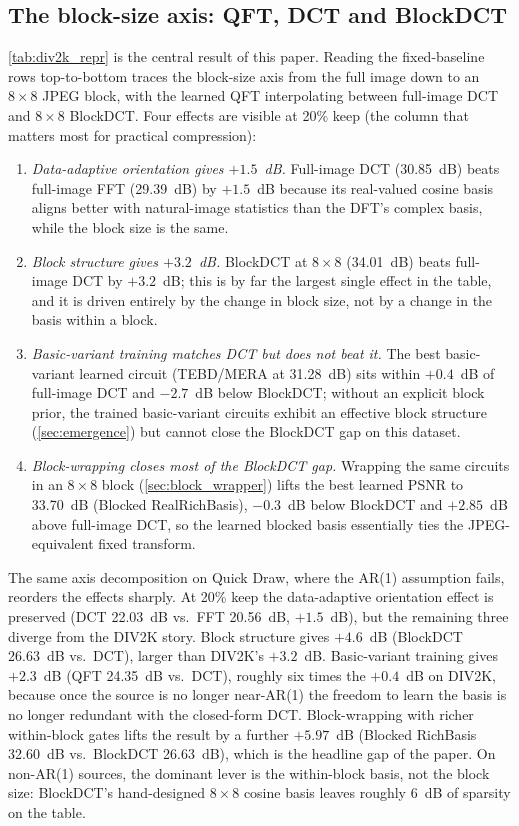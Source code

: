 \documentclass[a4paper, twocolumn]{quantumarticle}
\begin{document}
\subsection{The block-size axis: QFT, DCT and BlockDCT}
\label{sec:blocksize}

\cref{tab:div2k_repr} is the central result of this paper.
Reading the fixed-baseline rows top-to-bottom traces the block-size axis from the full image down to an $8 \times 8$ JPEG block, with the learned QFT interpolating between full-image DCT and $8 \times 8$ BlockDCT.
Four effects are visible at 20\% keep (the column that matters most for practical compression):
\begin{enumerate}
  \item \emph{Data-adaptive orientation gives $+1.5$~dB.} Full-image DCT (30.85~dB) beats full-image FFT (29.39~dB) by $+1.5$~dB because its real-valued cosine basis aligns better with natural-image statistics than the DFT's complex basis, while the block size is the same.
  \item \emph{Block structure gives $+3.2$~dB.} BlockDCT at $8 \times 8$ (34.01~dB) beats full-image DCT by $+3.2$~dB; this is by far the largest single effect in the table, and it is driven entirely by the change in block size, not by a change in the basis within a block.
  \item \emph{Basic-variant training matches DCT but does not beat it.} The best basic-variant learned circuit (TEBD/MERA at 31.28~dB) sits within $+0.4$~dB of full-image DCT and $-2.7$~dB below BlockDCT; without an explicit block prior, the trained basic-variant circuits exhibit an effective block structure (\cref{sec:emergence}) but cannot close the BlockDCT gap on this dataset.
  \item \emph{Block-wrapping closes most of the BlockDCT gap.} Wrapping the same circuits in an $8 \times 8$ block (\cref{sec:block_wrapper}) lifts the best learned PSNR to 33.70~dB (Blocked RealRichBasis), $-0.3$~dB below BlockDCT and $+2.85$~dB above full-image DCT, so the learned blocked basis essentially ties the JPEG-equivalent fixed transform.
\end{enumerate}

The same axis decomposition on Quick Draw, where the AR(1) assumption fails, reorders the effects sharply.
At 20\% keep the data-adaptive orientation effect is preserved (DCT 22.03~dB vs.\ FFT 20.56~dB, $+1.5$~dB), but the remaining three diverge from the DIV2K story.
Block structure gives $+4.6$~dB (BlockDCT 26.63~dB vs.\ DCT), larger than DIV2K's $+3.2$~dB.
Basic-variant training gives $+2.3$~dB (QFT 24.35~dB vs.\ DCT), roughly six times the $+0.4$~dB on DIV2K, because once the source is no longer near-AR(1) the freedom to learn the basis is no longer redundant with the closed-form DCT.
Block-wrapping with richer within-block gates lifts the result by a further $+5.97$~dB (Blocked RichBasis 32.60~dB vs.\ BlockDCT 26.63~dB), which is the headline gap of the paper.
On non-AR(1) sources, the dominant lever is the within-block basis, not the block size: BlockDCT's hand-designed $8 \times 8$ cosine basis leaves roughly $6$~dB of sparsity on the table.
\end{document}
